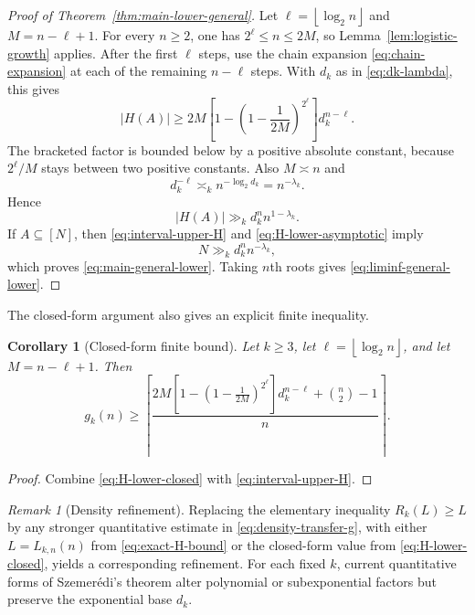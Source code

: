\documentclass[11pt]{article}
\numberwithin{equation}{section}
\newtheorem{corollary}[theorem]{Corollary}
\theoremstyle{definition}
\theoremstyle{remark}
\newtheorem{remark}[theorem]{Remark}
\newcommand{\ceil}[1]{\left\lceil #1\right\rceil}
\newcommand{\floor}[1]{\left\lfloor #1\right\rfloor}
\begin{document}
\begin{proof}[Proof of Theorem~\ref{thm:main-lower-general}]
Let $\ell=\floor{\log_2n}$ and $M=n-\ell+1$. For every $n\ge2$, one has $2^\ell\le n\le2M$, so Lemma~\ref{lem:logistic-growth} applies. After the first $\ell$ steps, use the chain expansion \eqref{eq:chain-expansion} at each of the remaining $n-\ell$ steps. With $d_k$ as in \eqref{eq:dk-lambda}, this gives
\begin{equation}\label{eq:H-lower-closed}
|H(A)|\ge
2M\left[1-\left(1-\frac1{2M}\right)^{2^\ell}\right]
d_k^{n-\ell}.
\end{equation}
The bracketed factor is bounded below by a positive absolute constant, because $2^\ell/M$ stays between two positive constants. Also $M\asymp n$ and
\begin{equation}\label{eq:dk-ell}
d_k^{-\ell}\asymp_k n^{-\log_2d_k}=n^{-\lambda_k}.
\end{equation}
Hence
\begin{equation}\label{eq:H-lower-asymptotic}
|H(A)|\gg_k d_k^n n^{1-\lambda_k}.
\end{equation}
If $A\subseteq[N]$, then \eqref{eq:interval-upper-H} and \eqref{eq:H-lower-asymptotic} imply
\[
N\gg_k d_k^n n^{-\lambda_k},
\]
which proves \eqref{eq:main-general-lower}. Taking $n$th roots gives \eqref{eq:liminf-general-lower}.
\end{proof}

\smallskip
\noindent
The closed-form argument also gives an explicit finite inequality.

\begin{corollary}[Closed-form finite bound]\label{cor:finite-general-lower}
Let $k\ge3$, let $\ell=\floor{\log_2n}$, and let $M=n-\ell+1$. Then
\begin{equation}\label{eq:finite-general-lower}
g_k(n)\ge
\ceil{
\frac{
2M\left[1-\left(1-\frac1{2M}\right)^{2^\ell}\right]d_k^{n-\ell}
+\binom{n}{2}-1
}{n}
}.
\end{equation}
\end{corollary}

\begin{proof}
Combine \eqref{eq:H-lower-closed} with \eqref{eq:interval-upper-H}.
\end{proof}

\begin{remark}[Density refinement]\label{rem:density-refinement}
Replacing the elementary inequality $R_k(L)\ge L$ by any stronger quantitative estimate in \eqref{eq:density-transfer-g}, with either $L=L_{k,n}(n)$ from \eqref{eq:exact-H-bound} or the closed-form value from \eqref{eq:H-lower-closed}, yields a corresponding refinement. For each fixed $k$, current quantitative forms of Szemer\'edi's theorem alter polynomial or subexponential factors but preserve the exponential base $d_k$.
\end{remark}
\end{document}
